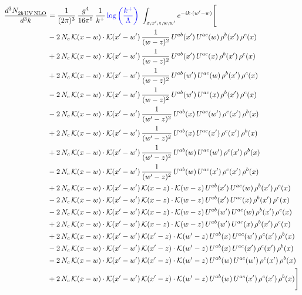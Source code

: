 \documentclass[9pt]{article}
\numberwithin{equation}{section}
\begin{document}
\begin{align}
\frac{d^{3}N_{2b\,\rm UV\, NLO}^{\rm}}{d^{3}k} & = \frac{1}{(2\pi)^{3}}\,\frac{g^{4}}{16\pi^{5}}\,\frac{1}{k^{+}}\,{\color{blue}\log{\left(\frac{k^{+}}{\Lambda}\right)}}\,\,\int_{x,x',z,w,w'}e^{-ik\cdot(w'-w)}\Bigg[\notag\\ & -2\,N_{c}\,\mathcal{K}(x-w)\cdot\mathcal{K}(x'-w')\,\frac{1}{(w-z)^{2}}\,U^{ab}(x')\,U^{ac}(w)\,\rho^{b}(x')\,\rho^{c}(x)\notag\\
&+2\,N_{c}\,\mathcal{K}(x-w)\cdot\mathcal{K}(x'-w')\,\frac{1}{(w-z)^{2}}\,U^{ab}(x')\,U^{ac}(x)\,\rho^{b}(x')\,\rho^{c}(x)\notag\\
&+2\,N_{c}\,\mathcal{K}(x-w)\cdot\mathcal{K}(x'-w')\,\frac{1}{(w-z)^{2}}\,U^{ab}(w')\,U^{ac}(w)\,\rho^{b}(x')\,\rho^{c}(x)\notag\\
&-2\,N_{c}\,\mathcal{K}(x-w)\cdot\mathcal{K}(x'-w')\,\frac{1}{(w-z)^{2}}\,U^{ab}(w')\,U^{ac}(x)\,\rho^{b}(x')\,\rho^{c}(x)\notag\\
&-2\,N_{c}\,\mathcal{K}(x-w)\cdot\mathcal{K}(x'-w')\,\frac{1}{(w'-z)^{2}}\,U^{ab}(x)\,U^{ac}(w')\,\rho^{c}(x')\,\rho^{b}(x)\notag\\
&+2\,N_{c}\,\mathcal{K}(x-w)\cdot\mathcal{K}(x'-w')\,\frac{1}{(w'-z)^{2}}\,U^{ab}(x)\,U^{ac}(x')\,\rho^{c}(x')\,\rho^{b}(x)\notag\\
&+2\,N_{c}\,\mathcal{K}(x-w)\cdot\mathcal{K}(x'-w')\,\frac{1}{(w'-z)^{2}}\,U^{ab}(w)\,U^{ac}(w')\,\rho^{c}(x')\,\rho^{b}(x)\notag\\
&-2\,N_{c}\,\mathcal{K}(x-w)\cdot\mathcal{K}(x'-w')\,\frac{1}{(w'-z)^{2}}\,U^{ab}(w)\,U^{ac}(x')\,\rho^{c}(x')\,\rho^{b}(x)\notag\\
&+2\,N_{c}\,\mathcal{K}(x-w)\cdot\mathcal{K}(x'-w')\,\mathcal{K}(x-z)\cdot\mathcal{K}(w-z)\,U^{ab}(x')\,U^{ac}(w)\,\rho^{b}(x')\,\rho^{c}(x)\notag\\
&-2\,N_{c}\,\mathcal{K}(x-w)\cdot\mathcal{K}(x'-w')\,\mathcal{K}(x-z)\cdot\mathcal{K}(w-z)\,U^{ab}(x')\,U^{ac}(x)\,\rho^{b}(x')\,\rho^{c}(x)\notag\\
&-2\,N_{c}\,\mathcal{K}(x-w)\cdot\mathcal{K}(x'-w')\,\mathcal{K}(x-z)\cdot\mathcal{K}(w-z)\,U^{ab}(w')\,U^{ac}(w)\,\rho^{b}(x')\,\rho^{c}(x)\notag\\
&+2\,N_{c}\,\mathcal{K}(x-w)\cdot\mathcal{K}(x'-w')\,\mathcal{K}(x-z)\cdot\mathcal{K}(w-z)\,U^{ab}(w')\,U^{ac}(x)\,\rho^{b}(x')\,\rho^{c}(x)\notag\\
&+2\,N_{c}\,\mathcal{K}(x-w)\cdot\mathcal{K}(x'-w')\,\mathcal{K}(x'-z)\cdot\mathcal{K}(w'-z)\,U^{ab}(x)\,U^{ac}(w')\,\rho^{c}(x')\,\rho^{b}(x)\notag\\
&-2\,N_{c}\,\mathcal{K}(x-w)\cdot\mathcal{K}(x'-w')\,\mathcal{K}(x'-z)\cdot\mathcal{K}(w'-z)\,U^{ab}(x)\,U^{ac}(x')\,\rho^{c}(x')\,\rho^{b}(x)\notag\\
&-2\,N_{c}\,\mathcal{K}(x-w)\cdot\mathcal{K}(x'-w')\,\mathcal{K}(x'-z)\cdot\mathcal{K}(w'-z)\,U^{ab}(w)\,U^{ac}(w')\,\rho^{c}(x')\,\rho^{b}(x)\notag\\
&+2\,N_{c}\,\mathcal{K}(x-w)\cdot\mathcal{K}(x'-w')\,\mathcal{K}(x'-z)\cdot\mathcal{K}(w'-z)\,U^{ab}(w)\,U^{ac}(x')\,\rho^{c}(x')\,\rho^{b}(x)\Bigg]
\end{align}
\end{document}
